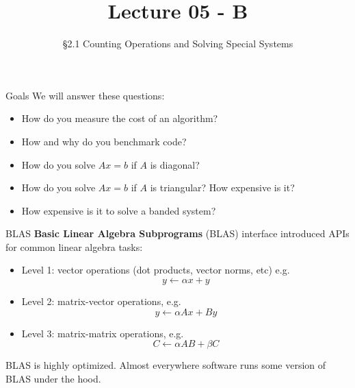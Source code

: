 \documentclass[10pt]{beamer}
\title[Math/CS 375]{Lecture 05 - B}
\subtitle{\S 2.1 Counting Operations and Solving Special Systems}
\begin{document}
\begin{frame}
  \titlepage
\end{frame}

\begin{frame}{Goals}
We will answer these questions:\\[3mm]
\begin{itemize}
    \item How do you measure the cost of an algorithm?
    \item How and why do you benchmark code?
    \item How do you solve $Ax=b$ if $A$ is diagonal?
    \item How do you solve $Ax=b$ if $A$ is triangular? How expensive is it?
    \item How expensive is it to solve a banded system?
\end{itemize}
\end{frame}



\begin{frame}{BLAS}
\textbf{Basic Linear Algebra Subprograms} (BLAS) interface introduced APIs for common linear algebra tasks:
  \begin{itemize}
  \item Level 1: vector operations (dot products, vector norms, etc) e.g.
    \[
    y \leftarrow \alpha x + y
    \]

  \item Level 2: matrix-vector operations, e.g.
    \[
    y \leftarrow \alpha A x +  B y
    \]

  \item Level 3: matrix-matrix operations, e.g.
    \[
    C \leftarrow \alpha A B +  \beta C
    \]
  \end{itemize}
BLAS is highly optimized. Almost everywhere software runs some version of BLAS under the hood.
\end{frame}
\end{document}
